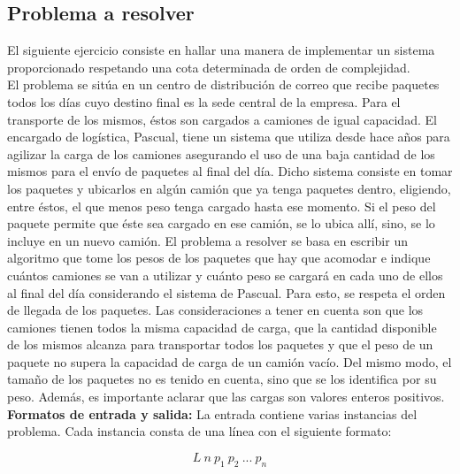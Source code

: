 \subsection{Problema a resolver}
El siguiente ejercicio consiste en hallar una manera de implementar un sistema proporcionado respetando una cota determinada de orden de complejidad.\\
\newline
El problema se sitúa en un centro de distribución de correo que recibe paquetes todos los días cuyo destino final es la sede central de la empresa. Para el transporte de los mismos, éstos son cargados a camiones de igual capacidad. El encargado de logística, Pascual, tiene un sistema que utiliza desde hace años para agilizar la carga de los camiones asegurando el uso de una baja cantidad de los mismos para el envío de paquetes al final del día. Dicho sistema consiste en tomar los paquetes y ubicarlos en algún camión que ya tenga paquetes dentro, eligiendo, entre éstos, el que menos peso tenga cargado hasta ese momento. Si el peso del paquete permite que éste sea cargado en ese camión, se lo ubica allí, sino, se lo incluye en un nuevo camión.\newline
\newline
El problema a resolver se basa en escribir un algoritmo que tome los pesos de los paquetes que hay que acomodar e indique cuántos camiones se van a utilizar y cuánto peso se cargará en cada uno de ellos al final del día considerando el sistema de Pascual. Para esto, se respeta el orden de llegada de los paquetes.\newline
\newline
Las consideraciones a tener en cuenta son que los camiones tienen todos la misma capacidad de carga, que la cantidad disponible de los mismos alcanza para transportar todos los paquetes y que el peso de un paquete no supera la capacidad de carga de un camión vacío. Del mismo modo, el tamaño de los paquetes no es tenido en cuenta, sino que se los identifica por su peso. Además, es importante aclarar que las cargas son valores enteros positivos.\newline
\newline
\textbf {Formatos de entrada y salida:}\newline
\newline
La entrada contiene varias instancias del problema. Cada instancia consta de una línea con el siguiente formato:

$$L\ n\ p_{1}\ p_{2}\ ...\ p_{n}$$


